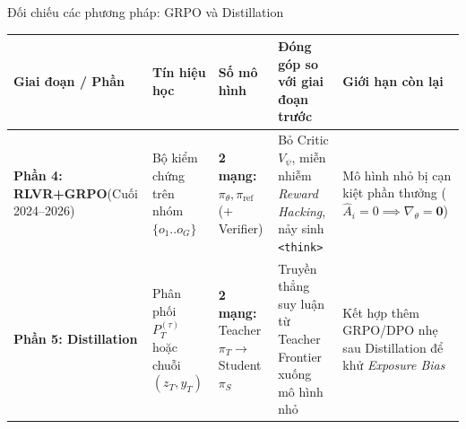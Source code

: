\begin{frame}{Đối chiếu các phương pháp: GRPO và Distillation}
\scriptsize
  \renewcommand{\arraystretch}{1.10}
  \setlength{\tabcolsep}{3pt}
\begin{tabularx}{\textwidth}{@{}>{\raggedright\arraybackslash}X >{\raggedright\arraybackslash}X >{\raggedright\arraybackslash}X >{\raggedright\arraybackslash}X >{\raggedright\arraybackslash}X@{}}
    \toprule
    \textbf{Giai đoạn / Phần} & \textbf{Tín hiệu học} & \textbf{Số mô hình} & \textbf{Đóng góp so với giai đoạn trước} & \textbf{Giới hạn còn lại} \\
    \midrule
    \textbf{Phần 4: RLVR+GRPO}\newline (Cuối 2024--2026) & Bộ kiểm chứng trên nhóm $\{o_1..o_G\}$ & \textbf{2 mạng:} $\pi_\theta, \pi_{\text{ref}}$ (+ Verifier) & Bỏ Critic $V_\psi$, miễn nhiễm \textit{Reward Hacking}, nảy sinh \texttt{<think>} & Mô hình nhỏ bị cạn kiệt phần thưởng ($\hat{A}_i = 0 \implies \nabla_\theta = \mathbf{0}$) \\

    \textbf{Phần 5: Distillation} & Phân phối $P_T^{(\tau)}$ hoặc chuỗi $(z_T, y_T)$ & \textbf{2 mạng:} Teacher $\pi_T \to$ Student $\pi_S$ & Truyền thẳng suy luận từ Teacher Frontier xuống mô hình nhỏ & Kết hợp thêm GRPO/DPO nhẹ sau Distillation để khử \textit{Exposure Bias} \\
    \bottomrule
  \end{tabularx}
  \par\vspace{0pt}
\end{frame}

